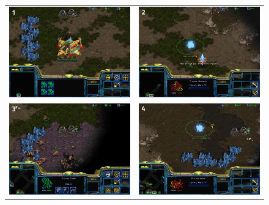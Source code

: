 \begin{figure}[!ht]
\begin{center}
\begin{tabular}{cc}
\includegraphics[width=7.8cm]{images/SC_game/SC_start_game.png} &
\includegraphics[width=7.8cm]{images/SC_game/SC_first_gate.png} \\
\includegraphics[width=7.8cm]{images/SC_game/SC_scout_opponent.png} & 
\includegraphics[width=7.8cm]{images/SC_game/SC_expand.png} \\ 

\end{tabular}
\end{center}
\end{figure}
